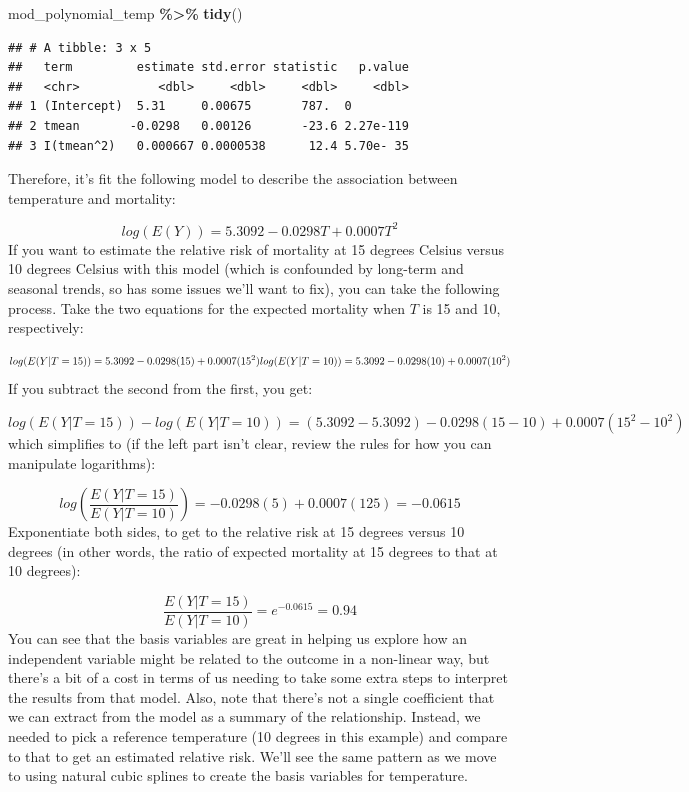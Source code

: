 \documentclass[
]{book}
\newenvironment{Shaded}{\begin{snugshade}}{\end{snugshade}}
\newcommand{\FunctionTok}[1]{\textcolor[rgb]{0.13,0.29,0.53}{\textbf{#1}}}
\newcommand{\NormalTok}[1]{#1}
\newcommand{\SpecialCharTok}[1]{\textcolor[rgb]{0.81,0.36,0.00}{\textbf{#1}}}
\begin{document}
\begin{Shaded}
\begin{Highlighting}[]
\NormalTok{mod\_polynomial\_temp }\SpecialCharTok{\%\textgreater{}\%} 
  \FunctionTok{tidy}\NormalTok{()}
\end{Highlighting}
\end{Shaded}

\begin{verbatim}
## # A tibble: 3 x 5
##   term         estimate std.error statistic   p.value
##   <chr>           <dbl>     <dbl>     <dbl>     <dbl>
## 1 (Intercept)  5.31     0.00675       787.  0        
## 2 tmean       -0.0298   0.00126       -23.6 2.27e-119
## 3 I(tmean^2)   0.000667 0.0000538      12.4 5.70e- 35
\end{verbatim}

Therefore, it's fit the following model to describe the association between temperature and
mortality:

\[
log(E(Y)) = 5.3092 - 0.0298T + 0.0007T^2
\]
If you want to estimate the relative risk of mortality at 15 degrees Celsius versus 10
degrees Celsius with this model (which is confounded by long-term and seasonal trends, so
has some issues we'll want to fix), you can take the following process. Take the two
equations for the expected mortality when \(T\) is 15 and 10, respectively:

\[
log(E(Y|T=15)) = 5.3092 - 0.0298(15) + 0.0007(15^2) \\
log(E(Y|T=10)) = 5.3092 - 0.0298(10) + 0.0007(10^2)  
\]
If you subtract the second from the first, you get:

\[
log(E(Y|T=15)) - log(E(Y|T=10)) = (5.3092 - 5.3092) - 0.0298(15 - 10) + 0.0007(15^2 - 10^2)
\]
which simplifies to (if the left part isn't clear, review the rules for how you can manipulate logarithms):

\[
log(\frac{E(Y|T=15)}{E(Y|T=10)}) = - 0.0298(5) + 0.0007(125) = -0.0615
\]
Exponentiate both sides, to get to the relative risk at 15 degrees versus 10 degrees (in
other words, the ratio of expected mortality at 15 degrees to that at 10 degrees):

\[
\frac{E(Y|T=15)}{E(Y|T=10)} = e^{-0.0615} =  0.94
\]
You can see that the basis variables are great in helping us explore how an independent
variable might be related to the outcome in a non-linear way, but there's a bit of a cost
in terms of us needing to take some extra steps to interpret the results from that model.
Also, note that there's not a single coefficient that we can extract from the model as
a summary of the relationship. Instead, we needed to pick a reference temperature (10 degrees
in this example) and compare to that to get an estimated relative risk. We'll see the
same pattern as we move to using natural cubic splines to create the basis variables for
temperature.
\end{document}
